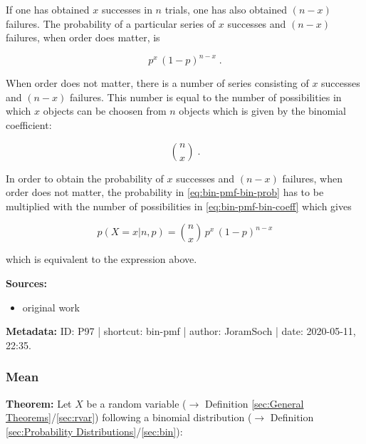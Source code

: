 \documentclass[a4paper,12pt,twoside]{book}
\begin{document}
If one has obtained $x$ successes in $n$ trials, one has also obtained $(n-x)$ failures. The probability of a particular series of $x$ successes and $(n-x)$ failures, when order does matter, is

\begin{equation} \label{eq:bin-pmf-bin-prob}
p^x \, (1-p)^{n-x} \; .
\end{equation}

When order does not matter, there is a number of series consisting of $x$ successes and $(n-x)$ failures. This number is equal to the number of possibilities in which $x$ objects can be choosen from $n$ objects which is given by the binomial coefficient:

\begin{equation} \label{eq:bin-pmf-bin-coeff}
{n \choose x} \; .
\end{equation}

In order to obtain the probability of $x$ successes and $(n-x)$ failures, when order does not matter, the probability in \eqref{eq:bin-pmf-bin-prob} has to be multiplied with the number of possibilities in \eqref{eq:bin-pmf-bin-coeff} which gives

\begin{equation} \label{eq:bin-pmf-bin-pmf-qed}
p(X=x|n,p) = {n \choose x} \, p^x \, (1-p)^{n-x}
\end{equation}

which is equivalent to the expression above.


\vspace{1em}
\textbf{Sources:}
\begin{itemize}
\item original work\end{itemize}


\vspace{1em}
\textbf{Metadata:} ID: P97 | shortcut: bin-pmf | author: JoramSoch | date: 2020-05-11, 22:35.
\vspace{1em}



\subsubsection[\textbf{Mean}]{Mean} \label{sec:bin-mean}
\setcounter{equation}{0}

\textbf{Theorem:} Let $X$ be a random variable ($\rightarrow$ Definition \ref{sec:General Theorems}/\ref{sec:rvar}) following a binomial distribution ($\rightarrow$ Definition \ref{sec:Probability Distributions}/\ref{sec:bin}):
\end{document}

